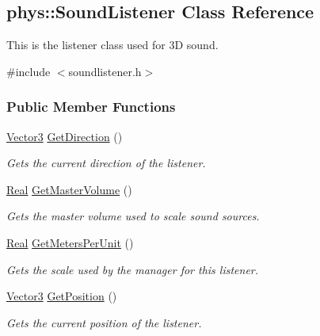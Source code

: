 \hypertarget{classphys_1_1SoundListener}{
\subsection{phys::SoundListener Class Reference}
\label{classphys_1_1SoundListener}
}


This is the listener class used for 3D sound.  




{\ttfamily \#include $<$soundlistener.h$>$}

\subsubsection*{Public Member Functions}
\begin{DoxyCompactItemize}
\item 
\hyperlink{classphys_1_1Vector3}{Vector3} \hyperlink{classphys_1_1SoundListener_a5277c24127bd23796710516c21154b49}{GetDirection} ()
\begin{DoxyCompactList}\small\item\em Gets the current direction of the listener. \item\end{DoxyCompactList}\item 
\hyperlink{namespacephys_af7eb897198d265b8e868f45240230d5f}{Real} \hyperlink{classphys_1_1SoundListener_a03acbadb9e7ebad0014269bf5c3bcf3d}{GetMasterVolume} ()
\begin{DoxyCompactList}\small\item\em Gets the master volume used to scale sound sources. \item\end{DoxyCompactList}\item 
\hyperlink{namespacephys_af7eb897198d265b8e868f45240230d5f}{Real} \hyperlink{classphys_1_1SoundListener_a97c834a1b8fec9ce3a0e705468d531e5}{GetMetersPerUnit} ()
\begin{DoxyCompactList}\small\item\em Gets the scale used by the manager for this listener. \item\end{DoxyCompactList}\item 
\hyperlink{classphys_1_1Vector3}{Vector3} \hyperlink{classphys_1_1SoundListener_ad0bec6f468f7bcfa3cadfafbd22a8603}{GetPosition} ()
\begin{DoxyCompactList}\small\item\em Gets the current position of the listener. \item\end{DoxyCompactList}\item 

\end{DoxyCompactItemize}
